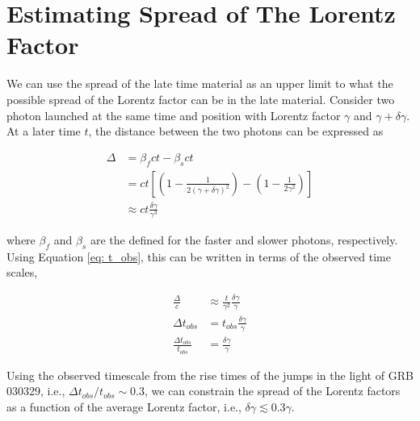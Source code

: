 \documentclass[linenumbers,twocolumn]{aastex631}
\begin{document}
\section{Estimating Spread of The Lorentz Factor}
{
    We can use the spread of the late time material as an upper limit to what the possible spread of the Lorentz factor can be in the late material. Consider two photon launched at the same time and position with Lorentz factor $\gamma$ and $\gamma+\delta \gamma$. At a later time $t$, the distance between the two photons can be expressed as

    \begin{align}
        \Delta &= \beta_f ct - \beta_s ct \\
        &= ct\left[\left(1-\frac{1}{2(\gamma+\delta \gamma)^2}\right)- \left(1 - \frac{1}{2\gamma^2}\right)\right]\\
        &\approx ct \frac{\delta \gamma}{\gamma^3}
    \end{align}

    where $\beta_f$ and $\beta_s$ are the defined for the faster and slower photons, respectively. Using Equation \ref{eq: t_obs}, this can be written in terms of the observed time scales, 

    \begin{align}
        \frac{\Delta}{c} &\approx \frac{t}{\gamma^2} \frac{\delta \gamma}{\gamma}\\
        \Delta t_{obs} &= t_{obs} \frac{\delta \gamma}{\gamma}\\
        \frac{\Delta t_{obs}}{t_{obs}} &= \frac{\delta \gamma}{\gamma}
    \end{align}

    Using the observed timescale from the rise times of the jumps in the light of GRB 030329, i.e., $\Delta t_{obs}/t_{obs} \sim 0.3$, we can constrain the spread of the Lorentz factors as a function of the average Lorentz factor, i.e., $\delta \gamma \lesssim 0.3 \gamma $.
}

    
\end{document}
